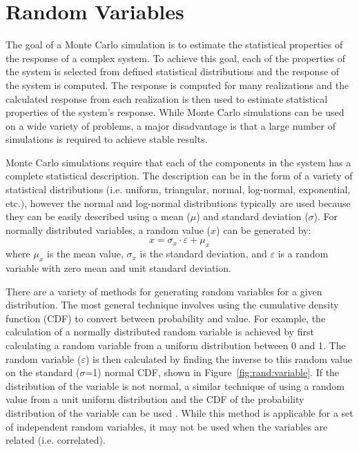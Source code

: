 \documentclass[12pt,oneside]{book}
\begin{document}
\section{Random Variables}
The goal of a Monte Carlo simulation is to estimate the statistical properties of the response of a
complex system.  To achieve this goal, each of the properties of the system is selected from defined
statistical distributions and the response of the system is computed.  The response is computed for
many realizations and the calculated response from each realization is then used to estimate
statistical properties of the system's response. While Monte Carlo simulations can be used on a wide
variety of problems, a major disadvantage is that a large number of simulations is required to
achieve stable results.

Monte Carlo simulations require that each of the components in the system has a complete statistical
description.  The description can be in the form of a variety of statistical distributions (i.e.
uniform, triangular, normal, log-normal, exponential, etc.), however the normal and log-normal
distributions typically are used because they can be easily described using a mean ($\mu$) and
standard deviation ($\sigma$).  For normally distributed variables, a random value ($x$) can be
generated by:
\begin{equation}
    x = \sigma_x \cdot \varepsilon + \mu_x
    \label{eq:randVar}
\end{equation}
where $\mu_x$ is the mean value, $\sigma_x$ is the standard deviation, and $\varepsilon$ is a random
variable with zero mean and unit standard deviation.

There are a variety of methods for generating random variables for a given distribution.  The most
general technique involves using the cumulative density function (CDF) to convert between
probability and value.  For example, the calculation of a normally distributed random variable is
achieved by first calculating a random variable from a uniform distribution between 0 and 1.  The
random variable ($\varepsilon$) is then calculated by finding the inverse to this random value on
the standard ($\sigma$=1) normal CDF, shown in Figure~\ref{fig:rand:variable}.  If the distribution
of the variable is not normal, a similar technique of using a random value from a unit uniform
distribution and the CDF of the probability distribution of the variable can be used
\citep{ang:vol2}.  While this method is applicable for a set of independent random variables, it may
not be used when the variables are related (i.e. correlated).
\end{document}
